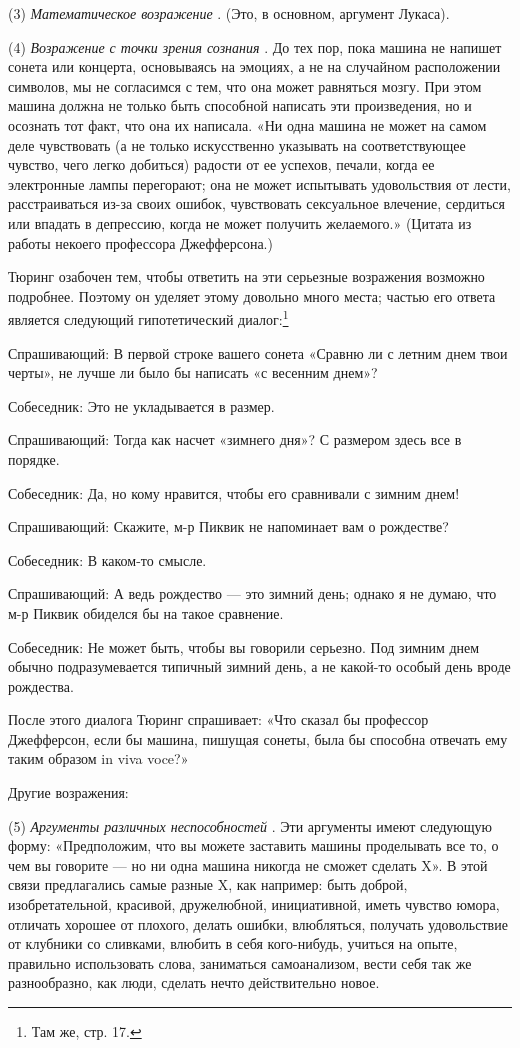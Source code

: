 \documentclass[../main.tex]{subfiles}
\begin{document}
(3) \emph{Математическое возражение} . (Это, в основном, аргумент Лукаса).

(4) \emph{Возражение с точки зрения сознания} . До тех пор, пока машина не напишет сонета или концерта, основываясь на эмоциях, а не на случайном расположении символов, мы не согласимся с тем, что она может равняться мозгу. При этом машина должна не только быть способной написать эти произведения, но и осознать тот факт, что она их написала. «Ни одна машина не может на самом деле чувствовать (а не только искусственно указывать на соответствующее чувство, чего легко добиться) радости от ее успехов, печали, когда ее электронные лампы перегорают; она не может испытывать удовольствия от лести, расстраиваться из-за своих ошибок, чувствовать сексуальное влечение, сердиться или впадать в депрессию, когда не может получить желаемого.» (Цитата из работы некоего профессора Джефферсона.)

Тюринг озабочен тем, чтобы ответить на эти серьезные возражения возможно подробнее. Поэтому он уделяет этому довольно много места; частью его ответа является следующий гипотетический диалог:\footnote{Там же, стр. 17.}

Спрашивающий: В первой строке вашего сонета «Сравню ли с летним днем твои черты», не лучше ли было бы написать «с весенним днем»?

Собеседник: Это не укладывается в размер.

Спрашивающий: Тогда как насчет «зимнего дня»? С размером здесь все в порядке.

Собеседник: Да, но кому нравится, чтобы его сравнивали с зимним днем!

Спрашивающий: Скажите, м-р Пиквик не напоминает вам о рождестве?

Собеседник: В каком-то смысле.

Спрашивающий: А ведь рождество --- это зимний день; однако я не думаю, что м-р Пиквик обиделся бы на такое сравнение.

Собеседник: Не может быть, чтобы вы говорили серьезно. Под зимним днем обычно подразумевается типичный зимний день, а не какой-то особый день вроде рождества.

После этого диалога Тюринг спрашивает: «Что сказал бы профессор Джефферсон, если бы машина, пишущая сонеты, была бы способна отвечать ему таким образом in viva voce?»

Другие возражения:

(5) \emph{Аргументы различных неспособностей} . Эти аргументы имеют следующую форму: «Предположим, что вы можете заставить машины проделывать все то, о чем вы говорите --- но ни одна машина никогда не сможет сделать X». В этой связи предлагались самые разные X, как например: быть доброй, изобретательной, красивой, дружелюбной, инициативной, иметь чувство юмора, отличать хорошее от плохого, делать ошибки, влюбляться, получать удовольствие от клубники со сливками, влюбить в себя кого-нибудь, учиться на опыте, правильно использовать слова, заниматься самоанализом, вести себя так же разнообразно, как люди, сделать нечто действительно новое.
\end{document}

